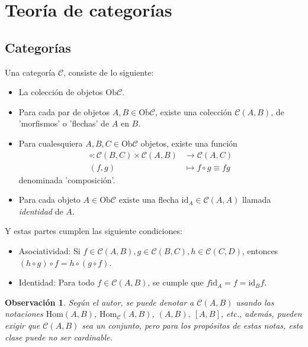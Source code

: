 \documentclass[12pt,letterpaper,titlepage]{article}
\newtheorem*{obs}{Observación}
\theoremstyle{definition}
\renewcommand\cal[1]{\mathcal{#1}}
\newcommand\<{\langle}
\renewcommand\>{\rangle}
\newcommand{\Ob}{\mathrm{Ob}}
\newcommand{\id}{\mathrm{id}}
\begin{document}
\section{Teoría de categorías}

\subsection{Categorías}
Una categoría  $\mathcal{C}$, consiste de lo siguiente:
\begin{itemize}
  \item La colección de objetos $\Ob\cal C$.
  \item Para cada par de objetos $A,B\in\Ob\cal C$, existe una colección
    $\cal C(A,B)$, de 'morfismos' o 'flechas' de $A$ en $B$.
  \item Para cualesquiera $A,B,C\in\Ob\cal C$ objetos, existe una
    función
    \begin{align*}
        \circ:\cal C(B,C)\times\cal C(A,B)&\to\cal C(A,C) \\
        (f,g)&\mapsto f\circ g\equiv fg 
    \end{align*}
    denominada 'composición'.
    \item Para cada objeto $A\in\Ob\cal C$ existe una flecha $\id_A\in\cal C(A,A)$ llamada
      \emph{identidad} de $A$.
\end{itemize}
Y estas partes cumplen las siguiente condiciones:
\begin{itemize}
  \item Asociatividad: Si $f\in\mathcal{C}(A,B),g\in\mathcal{C}(B,C),h\in\mathcal{C}(C,D)$, entonces $(h\circ g)\circ f = h\circ(g\circ f)$.
  \item Identidad: Para todo $f\in\mathcal{C}(A,B)$, se cumple que $f\id_A=f=\id_B f$.
\end{itemize}

\begin{obs}
Según el autor, se puede denotar a $\cal
C(A,B)$ usando las notaciones $\text{Hom}(A,B)$,
$\text{Hom}_{\cal C}(A,B)$, $(A,B)$, $[A,B]$, etc., además, pueden exigir que $\mathcal{C}(A,B)$ sea un conjunto, pero para los propósitos de estas notas, esta clase puede no ser cardinable.
\end{obs}
\end{document}
